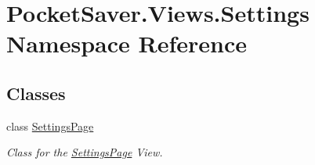 \hypertarget{namespace_pocket_saver_1_1_views_1_1_settings}{}\section{Pocket\+Saver.\+Views.\+Settings Namespace Reference}
\label{namespace_pocket_saver_1_1_views_1_1_settings}
\subsection*{Classes}
\begin{DoxyCompactItemize}
\item 
class \hyperlink{class_pocket_saver_1_1_views_1_1_settings_1_1_settings_page}{Settings\+Page}
\begin{DoxyCompactList}\small\item\em Class for the \hyperlink{class_pocket_saver_1_1_views_1_1_settings_1_1_settings_page}{Settings\+Page} View. \end{DoxyCompactList}\end{DoxyCompactItemize}
